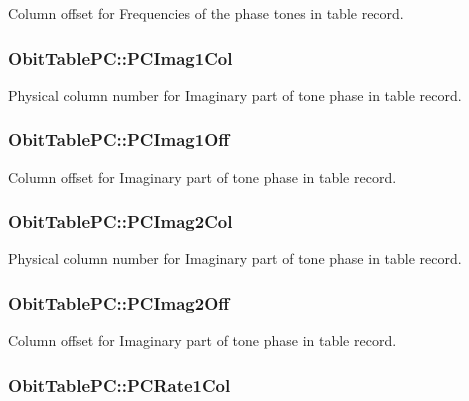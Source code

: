 Column offset for Frequencies of the phase tones in table record. 

\subsubsection{ {\bf Obit\-Table\-PC::PCImag1Col}}\label{structObitTablePC_o38}


Physical column number for Imaginary part of tone phase in table record. 

\subsubsection{ {\bf Obit\-Table\-PC::PCImag1Off}}\label{structObitTablePC_o37}


Column offset for Imaginary part of tone phase in table record. 

\subsubsection{ {\bf Obit\-Table\-PC::PCImag2Col}}\label{structObitTablePC_o48}


Physical column number for Imaginary part of tone phase in table record. 

\subsubsection{ {\bf Obit\-Table\-PC::PCImag2Off}}\label{structObitTablePC_o47}


Column offset for Imaginary part of tone phase in table record. 

\subsubsection{ {\bf Obit\-Table\-PC::PCRate1Col}}\label{structObitTablePC_o40}


